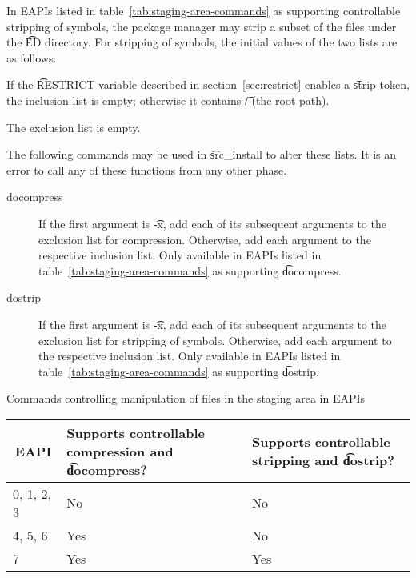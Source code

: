  In EAPIs listed in table~\ref{tab:staging-area-commands} as supporting
controllable stripping of symbols, the package manager may strip a subset of the files under the
\t{ED} directory. For stripping of symbols, the initial values of the two lists are as follows:

\begin{compactitem}
\item If the \t{RESTRICT} variable described in section~\ref{sec:restrict} enables a \t{strip}
    token, the inclusion list is empty; otherwise it contains \t{/} (the root path).
\item The exclusion list is empty.
\end{compactitem}

The following commands may be used in \t{src_install} to alter these lists. It is an error to call
any of these functions from any other phase.

\begin{description}
\item[docompress] If the first argument is \t{-x}, add each of its subsequent arguments to the
    exclusion list for compression. Otherwise, add each argument to the respective inclusion list.
    Only available in EAPIs listed in table~\ref{tab:staging-area-commands} as supporting
    \t{docompress}.

\item[dostrip] If the first argument is \t{-x}, add each of its subsequent arguments to the
    exclusion list for stripping of symbols. Otherwise, add each argument to the respective
    inclusion list. Only available in EAPIs listed in table~\ref{tab:staging-area-commands} as
    supporting \t{dostrip}.
\end{description}

\begin{centertable}{Commands controlling manipulation of files in the staging area in EAPIs}
    \label{tab:staging-area-commands}
    \begin{tabular}{lll}
      \toprule
      \multicolumn{1}{c}{\textbf{EAPI}} &
      \multicolumn{1}{P{13.5em}}{\textbf{Supports controllable compression and \t{docompress}?}} &
      \multicolumn{1}{P{10.5em}}{\textbf{Supports controllable stripping and \t{dostrip}?}} \\
      \midrule
      0, 1, 2, 3        & No  & No  \\
      4, 5, 6           & Yes & No  \\
      7                 & Yes & Yes \\
      \bottomrule
    \end{tabular}
\end{centertable}

